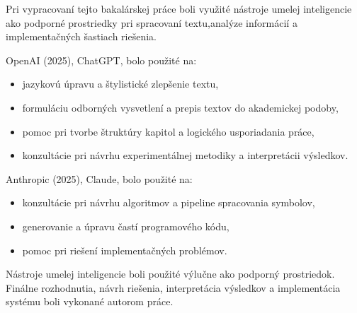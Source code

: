 Pri vypracovaní tejto bakalárskej práce boli využité nástroje umelej inteligencie ako podporné prostriedky pri spracovaní textu,analýze informácií a implementačných šastiach riešenia.

OpenAI (2025), ChatGPT, bolo použité na:
\begin{itemize}
	\item jazykovú úpravu a štylistické zlepšenie textu,
	\item formuláciu odborných vysvetlení a prepis textov do akademickej podoby,
	\item pomoc pri tvorbe štruktúry kapitol a logického usporiadania práce,
	\item konzultácie pri návrhu experimentálnej metodiky a interpretácii výsledkov.
\end{itemize}

Anthropic (2025), Claude, bolo použité na:
\begin{itemize}
	\item konzultácie pri návrhu algoritmov a pipeline spracovania symbolov,
	\item generovanie a úpravu častí programového kódu,
	\item pomoc pri riešení implementačných problémov.
\end{itemize}

Nástroje umelej inteligencie boli použité výlučne ako podporný prostriedok. Finálne rozhodnutia, návrh riešenia, interpretácia výsledkov a implementácia systému boli vykonané autorom práce.